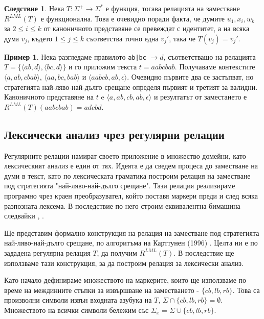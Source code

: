 \documentclass[12pt, oneside]{article}
\theoremstyle{definition}
\newtheorem{example}{Пример}[section]
\newtheorem{corollary}{Следствие}[section]
\begin{document}
\begin{corollary}
	Нека \( T: \Sigma^+ \to \Sigma^* \) е функция, тогава релацията на заместване \( R^{LML}(T) \) е функционална. Това е очевидно поради факта, че думите \(u_1, x_i, w_k \) за \( 2 \le i \le k \) от каноничното представяне се превеждат с идентитет, а на всяка дума \( v_j \), където \( 1 \le j \le k \) съответства точно една \( v_j' \), така че \( T(v_j) = v_j' \).
\end{corollary}

\begin{example}
	Нека разгледаме правилото \verb/ab|bc/ \( \to d \), съответстващо на релацията \(T = \{ \langle ab,d \rangle, \langle bc, d \rangle \} \) и го приложим текста \( t = aabcbab \). Получаваме контекстите \( \langle a, ab, cbab \rangle \), \( \langle aa, bc, bab \rangle \) и \( \langle aabcb, ab, \epsilon \rangle \). Очевидно първите два се застъпват, но стратегията най-ляво-най-дълго срещане определя първият и третият за валидни. Каноничното представяне на \(t \) e \( \langle a, ab, cb, ab, \epsilon  \rangle \) и резултатът от заместането е \( R^{LML}(T)(aabcbab) = adcbd \).
\end{example}

\pagebreak
\subsection{Лексически анализ чрез регулярни релации}
\label{sec:LexARegRel}
Регулярните релации намират своето приложение в множество домейни, като лексическият анализ е един от тях. Идеята е да сведем процеса до заместване на думи в текст, като по лексическата граматика построим релация на заместване под стратегията "най-ляво-най-дълго срещане". Тази релация реализираме програмно чрез краен преобразувател, който поставя маркери преди и след всяка разпозната лексема. В последствие по него строим еквивалентна бимашина следвайки \cite{GerdjikovEtAl:2017}, \cite{Mihov:2018-2}.

Ще представим формално конструкция на релация на заместване под стратегията най-ляво-най-дълго срещане, по алгоритъма на Карттунен (1996) \cite{Karttunen:96}. Целта ни е по зададена регулярна релация \(T\), да получим \( R^{LML}(T) \). В последствие ще използваме тази конструкция, за да построим релация за лексически анализ.

Като начало дефинираме множеството на маркерите, които ще използваме по време на междинните стъпки за извършване на заместването - \( \{ cb, lb, rb \} \). Това са произволни символи извън входната азубука на \(T\), \( \Sigma \cap \{ cb, lb, rb \} = \emptyset \). Множеството на всички символи бележим със \( \Sigma_x = \Sigma \cup \{ cb, lb, rb \} \). 
\end{document}
